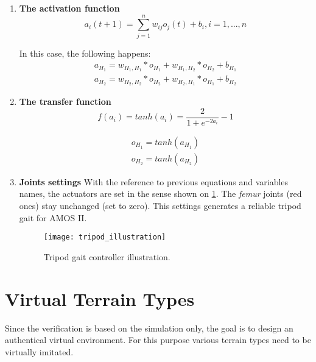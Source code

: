 \begin{enumerate}
\item \textbf{The activation function}
\begin{equation}
a_i(t+1) = \displaystyle\sum_{j=1}^{n} w_{ij}o_j(t) + b_i, i = 1, ..., n
\end{equation}

In this case, the following happens:
\begin{equation}
\begin{split}
a_{H_1} = w_{H_1,H_1} * o_{H_1} + w_{H_1,H_2} * o_{H_2} + b_{H_1} \\
a_{H_2} = w_{H_2,H_2} * o_{H_2} + w_{H_2,H_1} * o_{H_1} + b_{H_2}
\end{split}
\end{equation}

\item \textbf{The transfer function}
\begin{equation}
f(a_i) = tanh(a_i) = \frac{2}{1+e^{-2a_i}} - 1
\end{equation}

\begin{equation}
\begin{split}
o_{H_1} = tanh(a_{H_1}) \\
o_{H_2} = tanh(a_{H_2})
\end{split}
\end{equation}

\item \textbf{Joints settings}
With the reference to previous equations and variables names, the actuators are set in the sense shown on \cref{img:tripod_illustration}. The \textit{femur} joints (red ones) stay unchanged (set to zero). This settings generates a reliable tripod gait for AMOS II.

\begin{figure}[H]
  \centering
  \texttt{[image: tripod\_illustration]}
  \caption{Tripod gait controller illustration.}
  \label{img:tripod_illustration}
\end{figure}
\end{enumerate}

\section{Virtual Terrain Types} \label{sec:virtual_terrain_types}
Since the verification is based on the simulation only, the goal is to design an authentical virtual environment. For this purpose various terrain types need to be virtually imitated.

